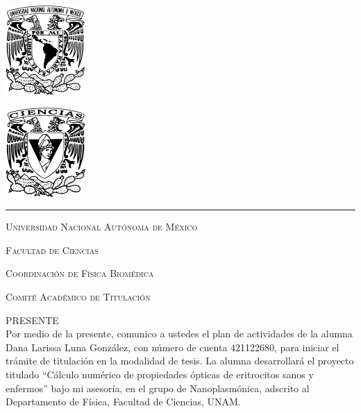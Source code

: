 \documentclass[11pt,letterpaper]{article}
\begin{document}
	
	
	\begin{center}
		\begin{minipage}{3cm}
			\begin{center}
				\includegraphics[height=3.4cm]{Logo_UNAM (1)}
			\end{center}
		\end{minipage}\hfill
		\begin{minipage}{3cm}
			\begin{center}
				\includegraphics[height=3.4cm]{Logo_FC (1)}
			\end{center}
		\end{minipage}
	\end{center}
	
	\rule{17cm}{0.1mm}
	
	\vspace{0.5cm}
	
	\hspace{10cm}{\raggedleft Ciudad Universitaria, 22 de abril de 2025}
	
	\hspace{1cm}
	
	\vspace{0.5cm}
	
	\textsc{Universidad Nacional Autónoma de México}
	
	\textsc{Facultad de Ciencias
	}
	
	\textsc{Coordinación de Física Biomédica
	}
	
	\textsc{Comité Académico de Titulación
	}
	
	\textsc{PRESENTE}\\
	
	\noindent
	Por medio de la presente, comunico a ustedes el plan de actividades de la alumna Dana Larissa Luna González, con número de cuenta 421122680, para  iniciar el trámite de titulación en la modalidad de tesis. La alumna desarrollará el proyecto titulado ``Cálculo numérico de propiedades ópticas de eritrocitos sanos y enfermos'' bajo mi asesoría, en el grupo de Nanoplasmónica, adscrito al Departamento de Física, Facultad de Ciencias, UNAM.\\
	
\end{document}

